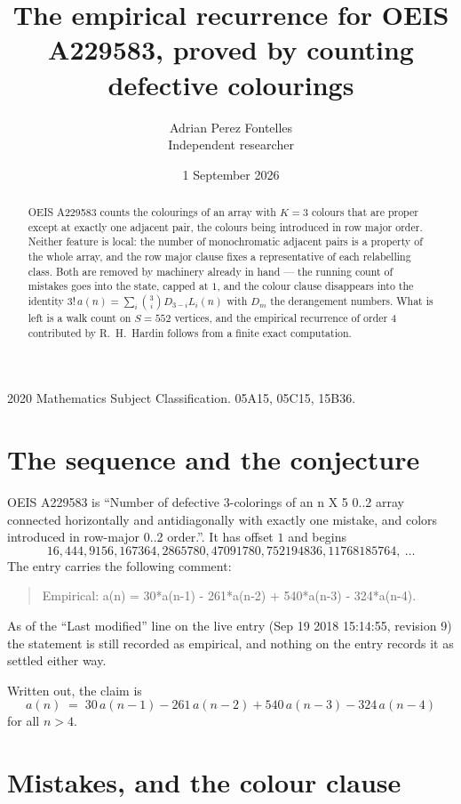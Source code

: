 \documentclass[11pt,a4paper]{article}
\title{The empirical recurrence for OEIS A229583, proved by counting defective colourings}
\author{Adrian Perez Fontelles\\ \small Independent researcher}
\date{1 September 2026}
\theoremstyle{plain}
\theoremstyle{definition}
\begin{document}
\maketitle

\begin{abstract}
OEIS A229583 counts the colourings of an array with $K=3$ colours that are proper except at
exactly one adjacent pair, the colours being introduced in row
major order. Neither feature is local: the number of monochromatic adjacent pairs is a
property of the whole array, and the row major clause fixes a representative of each
relabelling class. Both are removed by machinery already in hand --- the running count of
mistakes goes into the state, capped at $1$, and the colour clause disappears into the
identity $3!\,a(n)=\sum_i\binom{3}{i}D_{3-i}L_i(n)$ with $D_m$ the derangement
numbers. What is left is a walk count on $S=552$ vertices, and the empirical recurrence of
order $4$ contributed by R.~H.~Hardin follows from a finite exact computation.
\end{abstract}

\noindent\small 2020 Mathematics Subject Classification. 05A15, 05C15, 15B36.\normalsize

\section{The sequence and the conjecture}

OEIS A229583 is ``Number of defective 3-colorings of an n X 5 0..2 array connected horizontally and antidiagonally with exactly one mistake, and colors introduced in row-major 0..2 order.''. It has offset $1$ and begins
\[
16, 444, 9156, 167364, 2865780, 47091780, 752194836, 11768185764,\ \dots
\]
The entry carries the following comment:
\begin{quote}\small
Empirical: a(n) = 30*a(n-1) - 261*a(n-2) + 540*a(n-3) - 324*a(n-4).
\end{quote}
As of the ``Last modified'' line on the live entry (Sep 19 2018 15:14:55, revision 9) the statement is
still recorded as empirical, and nothing on the entry records it as settled either way.

Written out, the claim is
\begin{equation}\label{eq:conj}
a(n)\;=\;30\,a(n-1) - 261\,a(n-2) + 540\,a(n-3) - 324\,a(n-4)
\end{equation}
for all $n>4$.

\section{Mistakes, and the colour clause}
\end{document}
